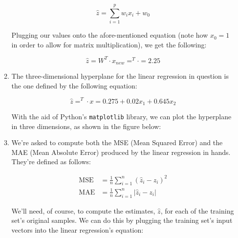 \documentclass[12pt]{article}
\begin{document}
\begin{enumerate}[leftmargin=\labelsep]
\begin{enumerate}
{                \begin{equation*}
                  \hat{z} = \sum_{i=1}^p w_i x_i + w_0
                \end{equation*}

                Plugging our values onto the afore-mentioned equation (note how $x_0=1$
                in order to allow for matrix multiplication), we get the following:

                \begin{equation*}
                  \hat{z} = W^T \cdot x_{new}
                  = ^T \cdot 
                  = 2.25
                \end{equation*}
                }
          \item {
                The three-dimensional hyperplane for the linear regression in question
                is the one defined by the following equation:

                \begin{equation*}
                  \hat{z} = ^T \cdot x
                  = 0.275 + 0.02x_1 + 0.645x_2
                \end{equation*}
                }

                With the aid of Python's \texttt{matplotlib} library, we can plot the
                hyperplane in three dimensions, as shown in the figure below:

                \begin{figure}[H]
                  \centering
                  
                \end{figure}
          \item {
                We're asked to compute both the MSE (Mean Squared Error) and the MAE
                (Mean Absolute Error) produced by the linear regression in hands.
                They're defined as follows:

                \begin{align*}
                  \text{MSE} & = \frac{1}{n} \sum_{i=1}^n (\hat{z}_i - z_i)^2 \\
                  \text{MAE} & = \frac{1}{n} \sum_{i=1}^n |\hat{z}_i - z_i|
                \end{align*}

                We'll need, of course, to compute the estimates, $\hat{z}$, for each
                of the training set's original samples. We can do this by plugging the
                training set's input vectors into the linear regression's equation:

}
\end{enumerate}
\end{enumerate}
\end{document}
